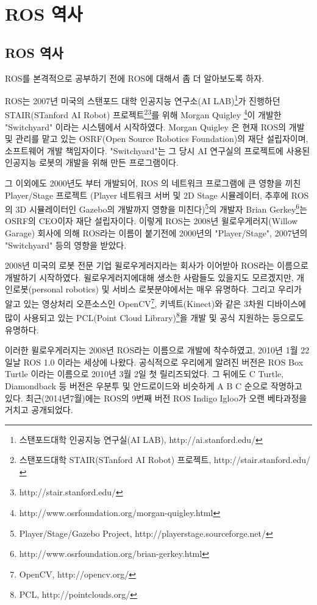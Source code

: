 \section{ROS 역사}

\subsection{ROS 역사}

ROS를 본격적으로 공부하기 전에 ROS에 대해서 좀 더 알아보도록 하자. 

ROS는 2007년 미국의 스탠포드 대학 인공지능 연구소(AI LAB)\footnote{스탠포드대학 인공지능 연구실(AI LAB), http://ai.stanford.edu/}가 진행하던 STAIR(STanford AI Robot) 프로젝트\footnote{스탠포드대학 STAIR(STanford AI Robot) 프로젝트, http://stair.stanford.edu/}\footnote{http://stair.stanford.edu/}를 위해 Morgan Quigley \footnote{http://www.osrfoundation.org/morgan-quigley.html}이 개발한 "Switchyard" 이라는 시스템에서 시작하였다. Morgan Quigley 은 현재 ROS의 개발 및 관리를 맡고 있는 OSRF(Open Source Robotics Foundation)의 재단 설립자이며, 소프트웨어 개발 책임자이다. "Switchyard"는 그 당시 AI 연구실의 프로젝트에 사용된 인공지능 로봇의 개발을 위해 만든 프로그램이다. 

그 이외에도 2000년도 부터 개발되어, ROS 의 네트워크 프로그램에 큰 영향을 끼친 Player/Stage 프로젝트 (Player 네트워크 서버 및 2D Stage 시뮬레이터, 추후에 ROS의 3D 시뮬레이터인 Gazebo의 개발까지 영향을 미친다)\footnote{Player/Stage/Gazebo Project, http://playerstage.sourceforge.net/}의 개발자 Brian Gerkey\footnote{http://www.osrfoundation.org/brian-gerkey.html}는 OSRF의 CEO이자 재단 설립자이다. 이렇게 ROS는 2008년 윌로우게러지(Willow Garage) 회사에 의해 ROS라는 이름이 붙기전에 2000년의 "Player/Stage", 2007년의 "Switchyard" 등의 영향을 받았다.

2008년 미국의 로봇 전문 기업  윌로우게러지라는 회사가 이어받아 ROS라는 이름으로 개발하기 시작하였다. 윌로우게러지에대해 생소한 사람들도 있을지도 모르겠지만, 개인로봇(personal robotics) 및 서비스 로봇분야에서는 매우 유명하다. 그리고 우리가 알고 있는 영상처리 오픈소스인 OpenCV\footnote{OpenCV, http://opencv.org/}, 키넥트(Kinect)와 같은 3차원 디바이스에 많이 사용되고 있는 PCL(Point Cloud Library)\footnote{PCL, http://pointclouds.org/}을 개발 및 공식 지원하는 등으로도 유명하다. 

이러한 윌로우게러지는 2008년 ROS라는 이름으로 개발에 착수하였고, 2010년 1월 22일날 ROS 1.0 이라는 세상에 나왔다. 공식적으로 우리에게 알려진 버전은 ROS Box Turtle 이라는 이름으로 2010년 3월 2일 첫 릴리즈되었다. 그 뒤에도 C Turtle, Diamondback 등 버전은 우분투 및 안드로이드와 비슷하게 A B C 순으로 작명하고 있다. 최근(2014년7월)에는 ROS의 9번째 버전 ROS Indigo Igloo가 오랜 베타과정을 거치고 공개되었다. 

